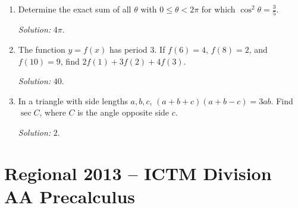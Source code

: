 \documentclass[11pt]{article}
\begin{document}
\begin{enumerate}[label=\textbf{\arabic*.}]
\item Determine the exact sum of all $\theta$ with $0\leq\theta<2\pi$ for which $\cos^2\theta=\frac35$.\par\textit{Solution: }$4\pi$.

\item The function $y=f(x)$ has period $3$. If $f(6)=4$, $f(8)=2$, and $f(10)=9$, find $2f(1)+3f(2)+4f(3)$.\par\textit{Solution: }$40$.

\item In a triangle with side lengths $a,b,c$, $(a+b+c)(a+b-c)=3ab$. Find $\sec C$, where $C$ is the angle opposite side $c$.\par\textit{Solution: }$2$.
\end{enumerate}

\section*{Regional 2013 -- ICTM Division AA Precalculus}
\end{document}
